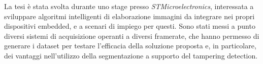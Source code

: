 La tesi \`e stata svolta durante uno stage presso \textit{STMicroelectronics}, interessata a sviluppare algoritmi intelligenti di elaborazione immagini da integrare nei propri dispositivi embedded, e a scenari di impiego per questi.
Sono stati messi a punto diversi sistemi di acquisizione operanti a diversi framerate, che hanno permesso di generare i dataset per testare l'efficacia della soluzione proposta e, in particolare, dei vantaggi nell'utilizzo della segmentazione a supporto del tampering detection. 